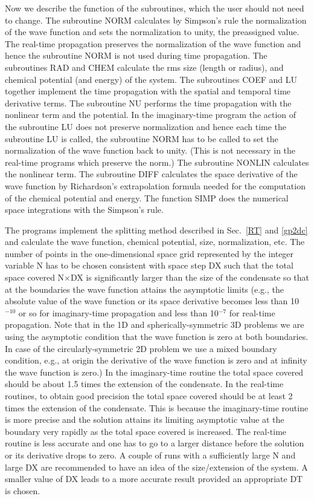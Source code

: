 \documentclass[onecolumn]{elsart3p}
\begin{document}
Now we describe the function of the subroutines, which  the user should not need
to change. The subroutine NORM calculates by Simpson's rule the normalization 
of the wave function and sets the normalization to unity, the preassigned value.
The real-time propagation preserves the normalization of the wave function and
hence the subroutine NORM is not used during time propagation. The subroutines
RAD and CHEM calculate the rms size (length or radius), and chemical 
potential (and energy) of
the system. The subroutines COEF and LU together implement the time propagation
with the spatial and temporal time derivative terms.  The subroutine NU performs
the time propagation with the nonlinear term and the potential.  In the
imaginary-time program the action of the subroutine LU does not preserve
normalization and hence each time the subroutine LU is called, the subroutine
NORM has to be called to set the normalization of the wave function back to
unity. (This is not necessary in the real-time programs which preserve the
norm.) The subroutine NONLIN calculates the nonlinear term. The subroutine DIFF
calculates the space derivative of the wave function by Richardson's
extrapolation formula needed for the computation of the chemical potential and
energy. The function SIMP does the numerical space integrations with the
Simpson's rule.



The programs implement the splitting method described in Sec.~\ref{RT} and
\ref{gp2dc} and calculate the wave function, chemical potential, size,
normalization, etc. The number of points in the one-dimensional space grid
represented by the integer variable N has to be chosen consistent with space
step DX such that the total space covered N$\times$DX is significantly larger
than the size of the condensate so that at the boundaries the wave 
function 
attains the asymptotic limits (e.g., the absolute value of the wave 
function  or its space derivative becomes 
less than 10$^{-10}$ or so 
for imaginary-time
propagation and less than 10$^{-7}$ for real-time propagation. Note 
that in the 1D and spherically-symmetric 3D problems we are using the 
asymptotic condition that the wave function is zero at both 
boundaries. In case of the circularly-symmetric 2D problem we use a mixed 
boundary condition, e.g.,  at origin the 
derivative of the wave function is zero and at infinity the wave 
function is zero.) In the
imaginary-time routine the total space covered should be about 1.5  times the
extension of the condensate. In the real-time routines, to obtain good 
precision the total space covered
should be at least 2  times the extension of the condensate. 
This is because the
imaginary-time routine is more precise and the solution attains its 
limiting asymptotic value at the
boundary very rapidly as the total space covered is increased. The real-time
routine is less accurate  and  one has to go to a larger distance before the
solution or its derivative drops to zero. A couple of runs with a 
sufficiently large N and large
DX are recommended to have an idea of the size/extension  of the system. 
A
smaller value of DX leads to a more accurate result provided an appropriate DT
is chosen.
\end{document}
